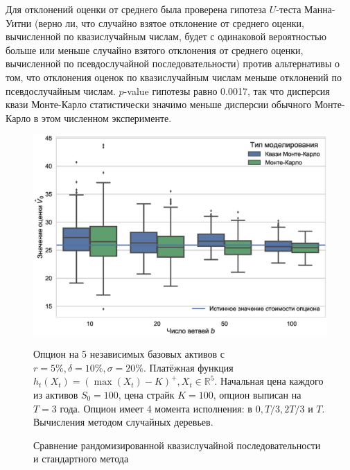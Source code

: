 \documentclass[specialist,
               substylefile = ../spbu.rtx,
               subf,href,colorlinks=true, 12pt]{disser}
\begin{document}
Для отклонений оценки от среднего была проверена гипотеза $U$-теста Манна-Уитни (верно ли, что случайно взятое отклонение от среднего оценки, вычисленной по квазислучайным числам, будет с одинаковой вероятностью больше или меньше случайно взятого отклонения от среднего оценки, вычисленной по псевдослучайной последовательности) против альтернативы о том, что отклонения оценок по квазислучайным числам меньше отклонений по псевдослучайным числам. $p$-value гипотезы равно 0.0017, так что дисперсия квази Монте-Карло статистически значимо меньше дисперсии обычного Монте-Карло в этом численном эксперименте.

\begin{figure}[h]
    \centering
	\includegraphics[width=\textwidth]{quasi_vs_common_mc.eps}
	\caption{Сравнение рандомизированной квазислучайной последовательности и стандартного метода}
	\footnotesize Опцион на 5 независимых базовых активов с $r = 5\%, \delta = 10\%, \sigma = 20\%$. Платёжная функция $h_t(X_t) = \left(\max(X_t) - K\right)^+, X_t\in \mathbb R^5$. Начальная цена каждого из активов $S_0 = 100$, цена страйк $K = 100$, опцион выписан на $T=3$ года. Опцион имеет 4 момента исполнения: в $0, T/3, 2T/3$ и $T$. Вычисления методом случайных деревьев.
	\label{fig:quasi_vs_common_mc}
\end{figure}
\end{document}
